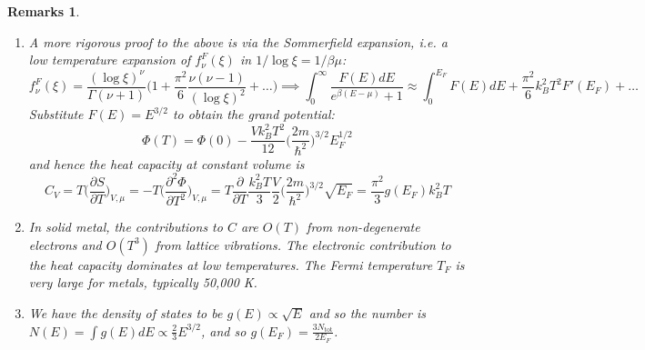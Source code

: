 \documentclass[a4paper]{article}
\newtheorem{remarks}{Remarks}[section]
\theoremstyle{new}
\begin{document}
\begin{remarks}\leavevmode
\begin{enumerate}
\item A more rigorous proof to the above is via the Sommerfield expansion, i.e. a low temperature expansion of $f_\nu^F(\xi)$ in $1/\log \xi=1/\beta\mu$:
$$f_\nu^F(\xi)=\frac{(\log \xi)^\nu}{\Gamma(\nu+1)}\bigg(1+\frac{\pi^2}{6}\frac{\nu(\nu-1)}{(\log \xi)^2}+\dots\bigg)\implies\int_0^\infty\frac{F(E)dE}{e^{\beta(E-\mu)}+1}\approx\int_0^{E_F}F(E)dE+\frac{\pi^2}{6}k_B^2T^2F'(E_F)+\dots$$
Substitute $F(E)=E^{3/2}$ to obtain the grand potential:
$$\Phi(T)=\Phi(0)-\frac{Vk_B^2T^2}{12}\bigg(\frac{2m}{\hbar^2}\bigg)^{3/2}E_F^{1/2}$$
and hence the heat capacity at constant volume is
$$C_V=T\bigg(\frac{\partial S}{\partial T}\bigg)_{V,\mu}=-T\bigg(\frac{\partial^2\Phi}{\partial T^2}\bigg)_{V,\mu}=T\frac{\partial}{\partial T}\frac{k_B^2T}{3}\frac{V}{2}\bigg(\frac{2m}{\hbar^2}\bigg)^{3/2}\sqrt{E_F}=\frac{\pi^2}{3}g(E_F)k_B^2T$$
\item In solid metal, the contributions to $C$ are $O(T)$ from non-degenerate electrons and $O(T^3)$ from lattice vibrations. The electronic contribution to the heat capacity dominates at low temperatures. The Fermi temperature $T_F$ is very large for metals, typically 50,000 K.
\item We have the density of states to be $g(E)\propto\sqrt{E}$ and so the number is $N(E)=\int g(E)dE\propto\frac{2}{3}E^{3/2}$, and so $g(E_F)=\frac{3N_{\text{tot}}}{2E_F}$.
\end{enumerate}
\end{remarks}
\end{document}

